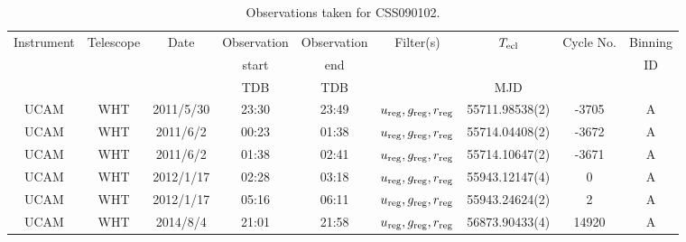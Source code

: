 \begin{table}
	\begin{center}
		\caption{Observations taken for CSS090102.}
		\label{table:observing:observation logs CSS090102}
		\begin{tabular}{ccccccccc}
			\hline
			Instrument & Telescope & Date & Observation  & Observation  & Filter(s) & $T_{\rm ecl}$ & Cycle No. & Binning \\
			 &  &  &  start &  end &  &  &  & ID \\
			 &  &  & TDB & TDB &  & MJD &  &  \\
			\hline
			\hline
			UCAM & WHT & 2011/5/30 & 23:30 & 23:49 & $u_{\rm reg},g_{\rm reg},r_{\rm reg}$ & 55711.98538(2) & -3705 & A \\
			UCAM & WHT & 2011/6/2  & 00:23 & 01:38 & $u_{\rm reg},g_{\rm reg},r_{\rm reg}$ & 55714.04408(2) & -3672 & A \\
			UCAM & WHT & 2011/6/2  & 01:38 & 02:41 & $u_{\rm reg},g_{\rm reg},r_{\rm reg}$ & 55714.10647(2) & -3671 & A \\
			UCAM & WHT & 2012/1/17 & 02:28 & 03:18 & $u_{\rm reg},g_{\rm reg},r_{\rm reg}$ & 55943.12147(4) &     0 & A \\
			UCAM & WHT & 2012/1/17 & 05:16 & 06:11 & $u_{\rm reg},g_{\rm reg},r_{\rm reg}$ & 55943.24624(2) &     2 & A \\
			UCAM & WHT & 2014/8/4  & 21:01 & 21:58 & $u_{\rm reg},g_{\rm reg},r_{\rm reg}$ & 56873.90433(4) & 14920 & A \\
		   \hline
		\end{tabular}
	\end{center}
\end{table}
